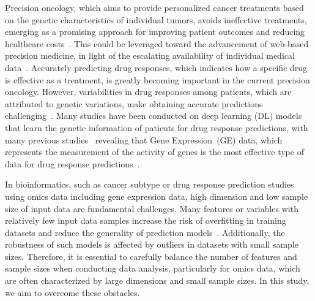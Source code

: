 \documentclass[runningheads]{llncs}
\begin{document}
Precision oncology, which aims to provide personalized cancer
treatments based on the genetic characteristics of individual tumors,
avoids ineffective treatments, emerging as a promising approach for
improving patient outcomes and reducing healthcare costs~\cite{1}. This
could be leveraged toward the advancement of web-based precision
medicine, in light of the escalating availability of individual
medical data~\cite{21}. Accurately predicting drug responses, which
indicates how a specific drug is effective as a treatment, is greatly
becoming important in the current precision oncology. However,
variabilities in drug responses among patients, which are attributed to genetic variations, make obtaining accurate predictions
challenging~\cite{2}. Many studies have been conducted on deep learning
(DL) models that learn the genetic information of patients for drug
response predictions, with many previous studies~\cite{3, 4} revealing that
Gene Expression~(GE) data, which represents the measurement of the
activity of genes is the most effective type of data for drug
response predictions~\cite{6, 8, 22, 25}.

In bioinformatics, such as cancer subtype or drug response
prediction studies using omics data including gene expression data, high dimension
and low sample size of input data are fundamental challenges. Many
features or variables with relatively few input data samples increase
the risk of overfitting in training datasets and reduce the generality
of prediction models~\cite{1, 23, 24}. Additionally, the robustness of
such models is affected by outliers in datasets with small sample
sizes. Therefore, it is essential to carefully balance the number of
features and sample sizes when conducting data analysis, particularly
for omics data, which are often characterized by large dimensions and
small sample sizes. In this study, we aim to overcome these obstacles.
\end{document}
